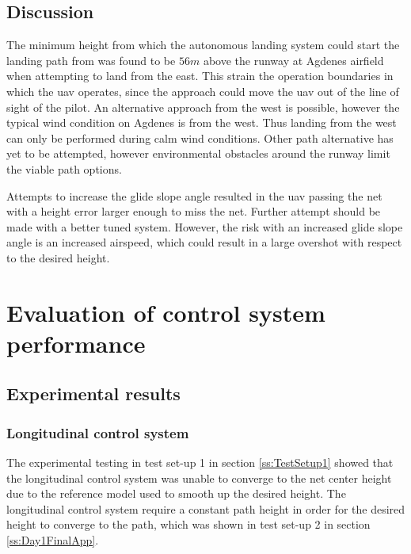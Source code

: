 \subsection{Discussion}
The minimum height from which the autonomous landing system could start the landing path from was found to be $56 m$ above the runway at Agdenes airfield when attempting to land from the east. This strain the operation boundaries in which the \gls{uav} operates, since the approach could move the \gls{uav} out of the line of sight of the pilot. An alternative approach from the west is possible, however the typical wind condition on Agdenes is from the west. Thus landing from the west can only be performed during calm wind conditions. Other path alternative has yet to be attempted, however environmental obstacles around the runway limit the viable path options.

Attempts to increase the glide slope angle resulted in the \gls{uav} passing the net with a height error larger enough to miss the net. Further attempt should be made with a better tuned system. However, the risk with an increased glide slope angle is an increased airspeed, which could result in a large overshot with respect to the desired height.
\section{Evaluation of control system performance}\label{ss:EvaluationControl}
\subsection{Experimental results}
\subsubsection{Longitudinal control system}
The experimental testing in test set-up 1 in section \ref{ss:TestSetup1} showed that the longitudinal control system was unable to converge to the net center height due to the reference model used to smooth up the desired height. The longitudinal control system require a constant path height in order for the desired height to converge to the path, which was shown in test set-up 2 in section \ref{ss:Day1FinalApp}.

